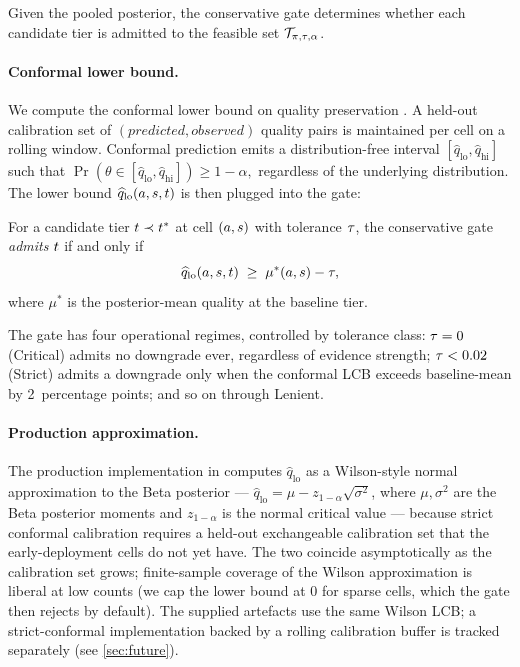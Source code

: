 Given the pooled posterior, the conservative gate determines whether each
candidate tier is admitted to the feasible set
$\mathcal{T}_{\pi, \tau, \alpha}$.

\paragraph{Conformal lower bound.}
We compute the conformal lower bound on quality preservation
\cite{angelopoulos2021gentle,vovk2005algorithmic}. A held-out calibration
set of $(predicted, observed)$ quality pairs is maintained per cell on a
rolling window. Conformal prediction emits a distribution-free interval
$[\widehat{q}_{\mathrm{lo}}, \widehat{q}_{\mathrm{hi}}]$ such that
\(
  \Pr(\theta \in [\widehat{q}_{\mathrm{lo}}, \widehat{q}_{\mathrm{hi}}])
    \geq 1 - \alpha,
\)
regardless of the underlying distribution. The lower bound
$\widehat{q}_{\mathrm{lo}}(a, s, t)$ is then plugged into the
gate:

\begin{definition}
\label{def:gate}
For a candidate tier $t \prec t^*$ at cell $(a, s)$ with
tolerance $\tau$, the conservative gate \emph{admits} $t$ if and
only if
\begin{equation}
  \widehat{q}_{\mathrm{lo}}(a, s, t)
    \;\geq\;
  \mu^*(a, s) - \tau,
  \label{eq:gate}
\end{equation}
where $\mu^*$ is the posterior-mean quality at the baseline tier.
\end{definition}

The gate has four operational regimes, controlled by tolerance class:
$\tau = 0$ (Critical) admits no downgrade ever, regardless of evidence
strength; $\tau < 0.02$ (Strict) admits a downgrade only when the
conformal LCB exceeds baseline-mean by 2~percentage points; and so on
through Lenient.

\paragraph{Production approximation.}
The production implementation in \cite{german2026blackrim} computes
$\widehat{q}_{\mathrm{lo}}$ as a Wilson-style normal approximation to
the Beta posterior --- $\widehat{q}_{\mathrm{lo}} = \mu - z_{1-\alpha}
\sqrt{\sigma^2}$, where $\mu, \sigma^2$ are the Beta posterior moments
and $z_{1-\alpha}$ is the normal critical value --- because strict
conformal calibration requires a held-out exchangeable calibration set
that the early-deployment cells do not yet have. The two coincide
asymptotically as the calibration set grows; finite-sample coverage of
the Wilson approximation is liberal at low counts (we cap the lower
bound at $0$ for sparse cells, which the gate then rejects by default).
The supplied artefacts \cite{blackrim_paper_repo} use the same Wilson
LCB; a strict-conformal implementation backed by a rolling calibration
buffer is tracked separately (see \cref{sec:future}).

